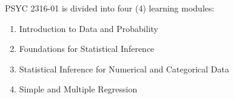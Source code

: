 \documentclass[article]{article}
\begin{document}
PSYC 2316-01 is divided into four (4) learning modules:
\begin{enumerate}
\item Introduction to Data and Probability
\item Foundations for Statistical Inference
\item Statistical Inference for Numerical and Categorical Data
\item Simple and Multiple Regression
\end{enumerate}

%
%
%
%
%
%
%
\end{document}
